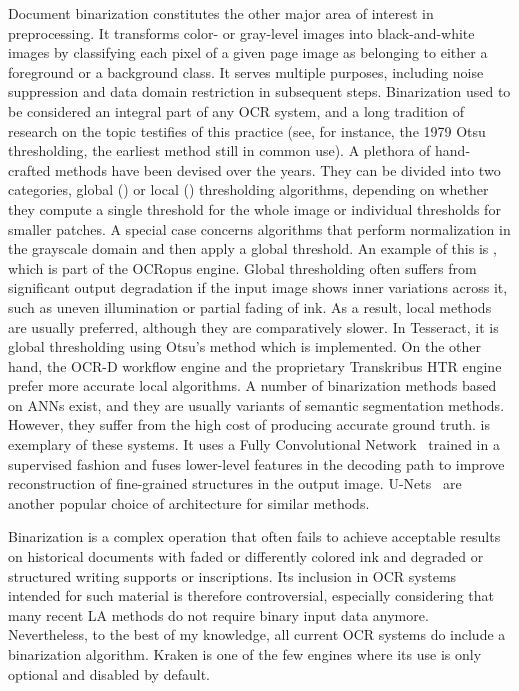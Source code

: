 Document binarization constitutes the other major area of interest in
preprocessing. It transforms color- or gray-level images into black-and-white
images by classifying each pixel of a given page image as belonging to either a
foreground or a background class. It serves multiple purposes, including noise
suppression and data domain restriction in subsequent steps. Binarization used
to be considered an integral part of any OCR system, and a long tradition of
research on the topic testifies of this practice (see, for instance, the 1979
Otsu thresholding\cite{otsu1979threshold}, the earliest method still in common
use). A plethora of hand-crafted methods have been devised over the years. They
can be divided into two categories, global (\cite{otsu1979threshold}) or local
(\cite{sauvola2000adaptive,niblack1986introduction,kim2002document,gatos2004adaptive})
thresholding algorithms, depending on whether they compute a single threshold
for the whole image or individual thresholds for smaller patches. A special
case concerns algorithms that perform normalization in the grayscale domain and
then apply a global threshold. An example of this is
\cite{shafait2008efficient}, which is part of the OCRopus engine. Global
thresholding often suffers from significant output degradation if the input
image shows inner variations across it, such as uneven illumination or partial
fading of ink. As a result, local methods are usually preferred, although they
are comparatively slower. In Tesseract, it is global thresholding using Otsu’s
method which is implemented. On the other hand, the OCR-D workflow engine
\cite{neudecker2019ocr} and the proprietary Transkribus HTR engine
\cite{ntirogiannis2014combined} prefer more accurate local algorithms. A number
of binarization methods based on ANNs exist, and they are usually variants of
semantic segmentation methods. However, they suffer from the high cost of
producing accurate ground truth. \cite{tensmeyer2017document} is exemplary of
these systems. It uses a Fully Convolutional Network~\cite{long2015fully}
trained in a supervised fashion and fuses lower-level features in the decoding
path to improve reconstruction of fine-grained structures in the output image.
U-Nets~\cite{ronneberger2015u} are another popular choice of architecture for
similar methods.

Binarization is a complex operation that often fails to achieve acceptable
results on historical documents with faded or differently colored ink and
degraded or structured writing supports or inscriptions. Its inclusion in OCR
systems intended for such material is therefore controversial, especially
considering that many recent LA methods do not require binary input data
anymore. Nevertheless, to the best of my knowledge, all current OCR systems do
include a binarization algorithm. Kraken is one of the few engines where its
use is only optional and disabled by default.

